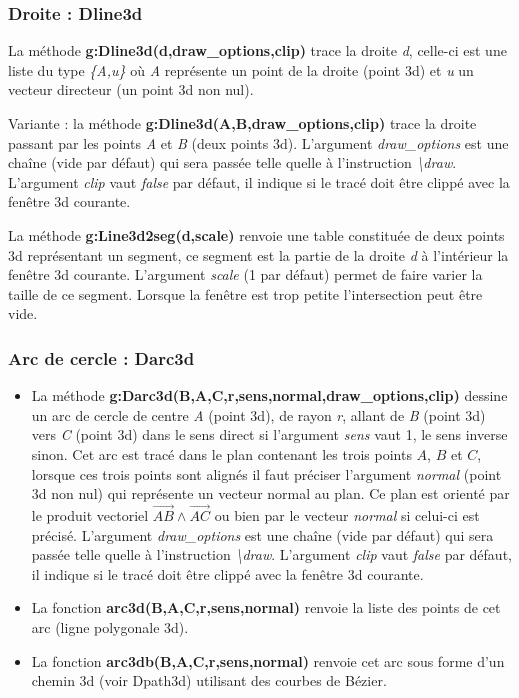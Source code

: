 \subsubsection{Droite : Dline3d}

La méthode \textbf{g:Dline3d(d,draw\_options,clip)} trace la droite \emph{d}, celle-ci est une liste du type \emph{\{A,u\}} où \emph{A} représente un point de la droite (point 3d) et \emph{u} un vecteur directeur (un point 3d non nul). 

Variante : la méthode \textbf{g:Dline3d(A,B,draw\_options,clip)} trace la droite passant par les points \emph{A} et \emph{B} (deux points 3d). L'argument \emph{draw\_options} est une chaîne (vide par défaut) qui sera passée telle quelle à l'instruction \emph{\textbackslash draw}. L'argument \emph{clip} vaut \emph{false} par défaut, il indique si le tracé doit être clippé avec la fenêtre 3d courante.

La méthode \textbf{g:Line3d2seg(d,scale)} renvoie une table constituée de deux points 3d représentant un segment, ce segment est la partie de la droite \emph{d} à l'intérieur la fenêtre 3d courante. L'argument \emph{scale} (1 par défaut) permet de faire varier la taille de ce segment. Lorsque la fenêtre est trop petite l'intersection peut être vide.

 \subsubsection{Arc de cercle : Darc3d}
 
\begin{itemize}
    \item La méthode \textbf{g:Darc3d(B,A,C,r,sens,normal,draw\_options,clip)} dessine un arc de cercle de centre \emph{A} (point 3d), de rayon \emph{r}, allant de \emph{B} (point 3d) vers \emph{C} (point 3d) dans le sens direct si l'argument \emph{sens} vaut 1, le sens inverse sinon. Cet arc est tracé dans le plan contenant les trois points $A$, $B$ et $C$, lorsque ces trois points sont alignés il faut préciser l'argument \emph{normal} (point 3d non nul) qui représente un vecteur normal au plan. Ce plan est orienté par le produit vectoriel $\vec{AB}\wedge\vec{AC}$ ou bien par le vecteur \emph{normal} si celui-ci est précisé. L'argument \emph{draw\_options} est une chaîne (vide par défaut) qui sera passée telle quelle à l'instruction \emph{\textbackslash draw}. L'argument \emph{clip} vaut \emph{false} par défaut, il indique si le tracé doit être clippé avec la fenêtre 3d courante.
    
    \item La fonction \textbf{arc3d(B,A,C,r,sens,normal)} renvoie la liste des points de cet arc (ligne polygonale 3d). 
    
    \item La fonction \textbf{arc3db(B,A,C,r,sens,normal)} renvoie cet arc sous forme d'un chemin 3d (voir Dpath3d) utilisant des courbes de Bézier.
\end{itemize}

